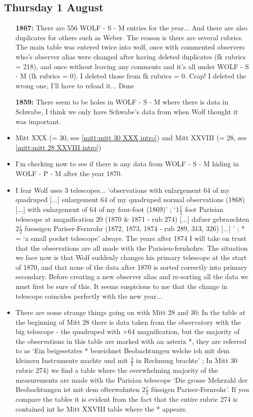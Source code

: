 \documentclass[12pt]{article}
\begin{document}
\subsection{Thursday 1 August}
\begin{itemize}
    \item[\textbf{1867:}] There are 556 WOLF - S - M entries for the year... And there are also duplicates for others such as Weber. The reason is there are several rubrics. The main table was entered twice into wolf, once with commented observers who's observer alias were changed after having deleted duplicates (fk rubrics = 218), and once without leaving any comments and it's all under WOLF - S - M (fk rubrics = 0). I deleted those from fk rubrics = 0. Crap! I deleted the wrong one, I'll have to reload it... Done
    \item[\textbf{1859:}] There seem to be holes in WOLF - S - M where there is data in Schwabe, I think we only have Schwabe's data from when Wolf thought it was important.
    \item Mitt XXX (= 30, see \ref{mitt:mitt 30 XXX intro}) and Mitt XXVIII (= 28, see \ref{mitt:mitt 28 XXVIII intro})
    \item I'm checking now to see if there is any data from WOLF - S - M hiding in WOLF - P - M after the year 1870.
    \item I fear Wolf uses 3 telescopes... `observations with enlargement 64 of my quadruped [...] enlargement 64 of my quadruped normal observations (1868) [...] with enlargement of 64 of my four-foot (1869)' ; `$1 \frac{1}{2}$ foot Parisian telescope at magnification 20 (1870 & 1871 - rub 274) [...] dafuer gebrauchten $2\frac{1}{2}$ fuessigen Pariser-Fernrohr (1872, 1873, 1874 - rub 289, 313, 326) [...] ' ; * = `a small pocket telescope' always. The years after 1874 I will take on trust that the observations are all made with the Parisien-fernhohre. The situation we face now is that Wolf suddenly changes his primary telescope at the start of 1870, and that none of the data after 1870 is sorted correctly into primary secondary. Before creating a new observer alias and re-sorting all the data we must first be sure of this. It seems suspicious to me that the change in telescope coincides perfectly with the new year...
    \item There are some strange things going on with Mitt 28 and 30: In the table at the beginning of Mitt 28 there is data taken from the observatory with the big telescope - the quadruped with $\times 64$ magnification, but the majority of the observations in this table are marked with an asterix *, they are referred to as `Ein beigesetztes * bezeichnet Beobachtungen welche ich mit dem kleinern Instrumente machte und mit $\frac{3}{2}$ in Rechnung brachte' ; In Mitt 30 rubric 274) we find a table where the overwhelming majority of the measurements are made with the Parisian telescope `Die grosse Mehrzahl der Beobachtungen ist mit dem ofterwahnten $2\frac{1}{2}$ füssigen Pariser-Fernrohr'. If you compare the tables it is evident from the fact that the entire rubric 274 is contained int he Mitt XXVIII table where the * appears. 

\end{itemize}
\end{document}
